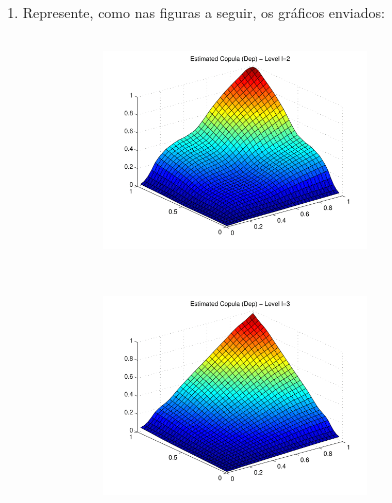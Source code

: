 \documentclass[11pt]{article}
\begin{document}
\begin{enumerate}



\item Represente, como nas figuras a seguir, os gráficos enviados:

\begin{figure}[H]
    \centering
    \caption{Graphical representations of the estimated copula at different levels - dependent components without thresholds.\\
    Last graphic is for the Normal copula.}
    \begin{subfigure}
    \centering
    \includegraphics[width=7cm, height=6cm]{Figura1-1.png}
    \end{subfigure}
    \begin{subfigure}
    \centering
    \includegraphics[width=7cm, height=6cm]{Figura2-1.png}
    \end{subfigure}
    

\end{figure}
\end{enumerate}
\end{document}
